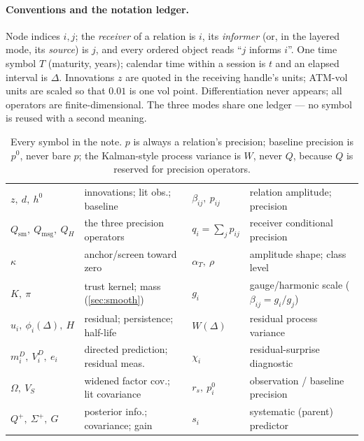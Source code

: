 \documentclass[11pt]{article}
\newcommand{\Qsm}{Q_{\mathrm{sm}}}
\newcommand{\Qmsg}{Q_{\mathrm{msg}}}
\newcommand{\QH}{Q_{H}}
\begin{document}
\paragraph{Conventions and the notation ledger.}
Node indices $i,j$; the \emph{receiver} of a relation is $i$, its
\emph{informer} (or, in the layered mode, its \emph{source}) is $j$, and
every ordered object reads ``$j$ informs $i$''.  One time symbol $T$
(maturity, years); calendar time within a session is $t$ and an elapsed
interval is $\Delta$.  Innovations $z$ are quoted in the receiving handle's
units; ATM-vol units are scaled so that $0.01$ is one vol point.
Differentiation never appears; all operators are finite-dimensional.  The
three modes share one ledger --- no symbol is reused with a second meaning.

\begin{table}[H]
\centering\footnotesize
\setlength{\tabcolsep}{3pt}
\begin{tabular}{@{}llll@{}}
\toprule
$z,\ d,\ h^0$ & innovations; lit obs.; baseline &
$\beta_{ij},\ p_{ij}$ & relation amplitude; precision\\[2pt]
$\Qsm,\ \Qmsg,\ \QH$ & the three precision operators &
$q_i=\textstyle\sum_j p_{ij}$ & receiver conditional precision\\[2pt]
$\kappa$ & anchor/screen toward zero &
$\alpha_T,\ \rho$ & amplitude shape; class level\\[2pt]
$K,\ \pi$ & trust kernel; mass (\cref{sec:smooth}) &
$g_i$ & gauge/harmonic scale ($\beta_{ij}=g_i/g_j$)\\[2pt]
$u_i,\ \phi_i(\Delta),\ H$ & residual; persistence; half-life &
$W(\Delta)$ & residual process variance\\[2pt]
$m^D_i,\ V^D_i,\ e_i$ & directed prediction; residual meas. &
$\chi_i$ & residual-surprise diagnostic\\[2pt]
$\Omega,\ V_S$ & widened factor cov.; lit covariance &
$r_s,\ p^0_i$ & observation / baseline precision\\[2pt]
$Q^+,\ \Sigma^+,\ G$ & posterior info.; covariance; gain &
$s_i$ & systematic (parent) predictor\\
\bottomrule
\end{tabular}
\caption{Every symbol in the note.  $p$ is always a relation's precision;
baseline precision is $p^0$, never bare $p$; the Kalman-style process
variance is $W$, never $Q$, because $Q$ is reserved for precision
operators.}
\label{tab:ledger}
\end{table}
\end{document}
